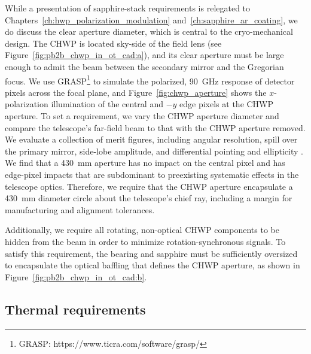 While a presentation of sapphire-stack requirements is relegated to Chapters~\ref{ch:hwp_polarization_modulation} and~\ref{ch:sapphire_ar_coating}, we do discuss the clear aperture diameter, which is central to the cryo-mechanical design. The CHWP is located sky-side of the field lens (see Figure~\ref{fig:pb2b_chwp_in_ot_cad:a}), and its clear aperture must be large enough to admit the beam between the secondary mirror and the Gregorian focus. We use GRASP\footnote{GRASP: https://www.ticra.com/software/grasp/} to simulate the polarized, 90~GHz response of detector pixels across the focal plane, and Figure~\ref{fig:chwp_aperture} shows the $x$-polarization illumination of the central and $-y$ edge pixels at the CHWP aperture. To set a requirement, we vary the CHWP aperture diameter and compare the telescope's far-field beam to that with the CHWP aperture removed. We evaluate a collection of merit figures, including angular resolution, spill over the primary mirror, side-lobe amplitude, and differential pointing and ellipticity \cite{shimon_cmb_2008}. We find that a 430~mm aperture has no impact on the central pixel and has edge-pixel impacts that are subdominant to preexisting systematic effects in the telescope optics. Therefore, we require that the CHWP aperture encapsulate a 430~mm diameter circle about the telescope's chief ray, including a margin for manufacturing and alignment tolerances.

Additionally, we require all rotating, non-optical CHWP components to be hidden from the beam in order to minimize rotation-synchronous signals. To satisfy this requirement, the bearing and sapphire must be sufficiently oversized to encapsulate the optical baffling that defines the CHWP aperture, as shown in Figure~\ref{fig:pb2b_chwp_in_ot_cad:b}. 


\subsection{Thermal requirements}
\label{sec:thermal_requirements}

